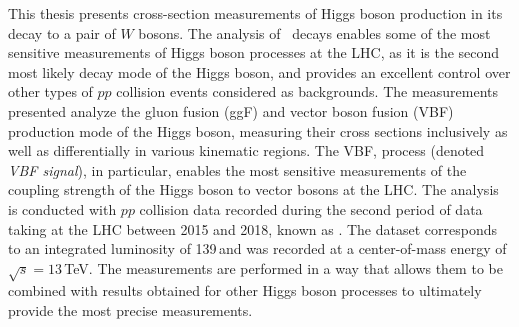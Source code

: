 This thesis presents cross-section measurements of Higgs boson production in its decay to a pair of $W$ bosons.
The analysis of \HWW\ decays enables some of the most sensitive measurements of Higgs boson processes at the LHC, as it is the second most likely decay mode of the Higgs boson, and provides an excellent control over other types of $pp$ collision events considered as backgrounds. 
The measurements presented analyze the gluon fusion (ggF) and vector boson fusion (VBF) production mode of the Higgs boson, measuring their cross sections inclusively as well as differentially in various kinematic regions.
The VBF, \HWW process (denoted \emph{VBF signal}), in particular, enables the most sensitive measurements of the coupling strength of the Higgs boson to vector bosons at the LHC. 
The analysis is conducted with $pp$ collision data recorded during the second period of data taking at the LHC between 2015 and 2018, known as \RunTwo. The dataset corresponds to an integrated luminosity of 139\,\ifb and was recorded at a center-of-mass energy of $\sqrt{s} = 13\,$TeV.
The measurements are performed in a way that allows them to be combined with results obtained for other Higgs boson processes to ultimately provide the most precise measurements.

